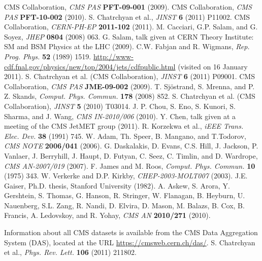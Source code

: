\documentclass[12pt, letterpaper]{report}
\begin{document}
\begin{thebibliography}{99}
 CMS Collaboration, \textit{CMS PAS} \textbf{PFT-09-001} (2009).
 CMS Collaboration, \textit{CMS PAS} \textbf{PFT-10-002} (2010).
 S. Chatrchyan et al., \textit{JINST} \textbf{6} (2011) P11002.
 CMS Collaboration, \textit{CERN-PH-EP} \textbf{2011-102} (2011).
 M. Cacciari, G.P. Salam, and G. Soyez, \textit{JHEP} \textbf{0804} (2008) 063.
 G. Salam, talk given at CERN Theory Institute: SM and BSM Physics at the LHC (2009).
 C.W. Fabjan and R. Wigmans, \textit{Rep. Prog. Phys.} \textbf{52} (1989) 1519.
 \url{http://www-cdf.fnal.gov/physics/new/top/2004/jets/cdfpublic.html} (visited on 16 January 2011).
 S. Chatrchyan et al. (CMS Collaboration), \textit{JINST} \textbf{6} (2011) P09001.
 CMS Collaboration, \textit{CMS PAS} \textbf{JME-09-002} (2009).
 T. Sj\"ostrand, S. Mrenna, and P. Z. Skands, \textit{Comput. Phys. Commun.} \textbf{178} (2008) 852.
 S. Chatrchyan et al. (CMS Collaboration), \textit{JINST} \textbf{5} (2010) T03014.
 J. P. Chou, S. Eno, S. Kunori, S. Sharma, and J. Wang, \textit{CMS IN-2010/006} (2010).
 Y. Chen, talk given at a meeting of the CMS JetMET group (2011).
 R. Korzekwa et al., \textit{iEEE Trans. Elec. Dev.} \textbf{38} (1991) 745.
 W. Adam, Th. Speer, B. Mangano, and T.Todorov, \textit{CMS NOTE} \textbf{2006/041} (2006).
 G. Daskalakis, D. Evans, C.S. Hill, J. Jackson, P. Vanlaer, J. Berryhill, J. Haupt, D. Futyan, C. Seez, C. Timlin, and D. Wardrope, \textit{CMS AN-2007/019} (2007).
 F. James and M. Roos, \textit{Comput. Phys. Commun.} \textbf{10} (1975) 343.
 W. Verkerke and D.P. Kirkby, \textit{CHEP-2003-MOLT007} (2003).
 J.E. Gaiser, Ph.D. thesis, Stanford University (1982).
 A. Askew, S. Arora, Y. Gershtein, S. Thomas, G. Hanson, R. Stringer, W. Flanagan, B. Heyburn, U. Nauenberg, S.L. Zang, R. Nandi, D. Elvira, D. Mason, M. Balazs, B. Cox, B. Francis, A. Ledovskoy, and R. Yohay, \textit{CMS AN} \textbf{2010/271} (2010).


 Information about all CMS datasets is available from the CMS Data Aggregation System (DAS), located at the URL \url{https://cmsweb.cern.ch/das/}.
 S. Chatrchyan et al., \textit{Phys. Rev. Lett.} \textbf{106} (2011) 211802.


\end{thebibliography}
\end{document}

